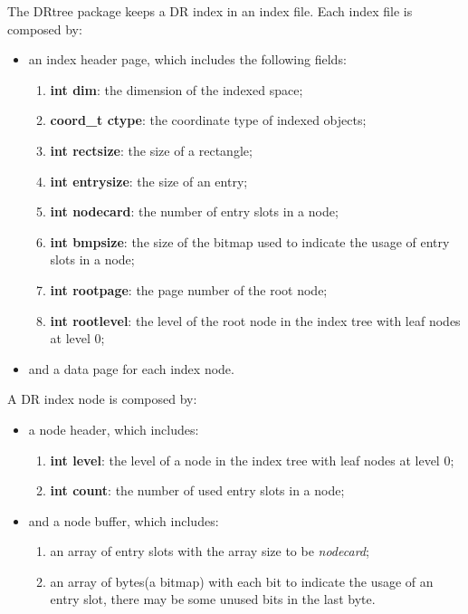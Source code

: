 The DRtree package keeps a DR index in an index file. Each index file is
composed by:
\begin{itemize}
	\item
	an index header page, which includes the following fields:
	\begin{enumerate}
		\item
		{\bf int dim}: the dimension of the indexed space;
		\item
		{\bf coord\_t ctype}: the coordinate type of indexed objects;
		\item
		{\bf int rectsize}: the size of a rectangle;
		\item
		{\bf int entrysize}: the size of an entry;
		\item
		{\bf int nodecard}: the number of entry slots in a node;
		\item
		{\bf int bmpsize}: the size of the bitmap used to indicate the
		usage of entry slots in a node;
		\item
		{\bf int rootpage}: the page number of the root node;
		\item
		{\bf int rootlevel}: the level of the root node in the index
		tree with leaf nodes at level 0;
	\end{enumerate}

	\item
	and a data page for each index node.\\
\end{itemize}

A DR index node is composed by:
\begin{itemize}
	\item
	a node header, which includes:
	\begin{enumerate}
		\item
		{\bf int level}: the level of a node in the index tree
		with leaf nodes at level 0;
		\item
		{\bf int count}: the number of used entry slots in a node;
	\end{enumerate}

	\item
	and a node buffer, which includes:
	\begin{enumerate}
		\item
		an array of entry slots with the array size to be {\em nodecard};
		\item
		an array of bytes(a bitmap) with each bit to indicate
		the usage of an entry slot, there may be some unused bits
		in the last byte.\\
	\end{enumerate}
\end{itemize}

